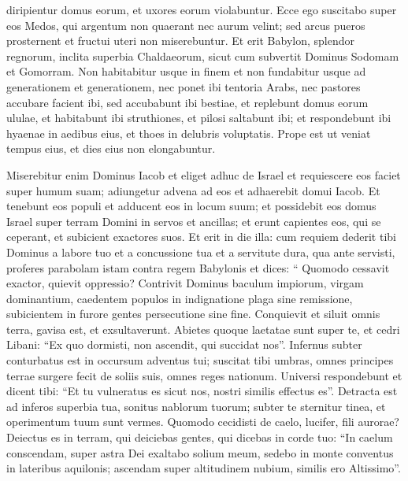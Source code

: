 \begin{biblechapter}
\begin{biblechapter}
\begin{biblechapter}
\begin{biblechapter}
\begin{biblechapter}
\begin{biblechapter}
\begin{biblechapter}
\begin{biblechapter}
\begin{biblechapter}
\begin{biblechapter}
\begin{biblechapter}
\begin{biblechapter}
\begin{biblechapter}
 diripientur domus eorum,
 et uxores eorum violabuntur.
 \verse Ecce ego suscitabo super eos Medos,
 qui argentum non quaerant nec aurum velint;
 \verse sed arcus pueros prosternent
 et fructui uteri non miserebuntur.
 \verse Et erit Babylon, splendor regnorum,
 inclita superbia Chaldaeorum,
 sicut cum subvertit Dominus Sodomam et Gomorram.
 \verse Non habitabitur usque in finem
 et non fundabitur usque ad generationem et generationem,
 nec ponet ibi tentoria Arabs,
 nec pastores accubare facient ibi,
 \verse sed accubabunt ibi bestiae,
 et replebunt domus eorum ululae,
 et habitabunt ibi struthiones,
 et pilosi saltabunt ibi;
 \verse et respondebunt ibi hyaenae in aedibus eius,
 et thoes in delubris voluptatis.
 Prope est ut veniat tempus eius,
 et dies eius non elongabuntur.
 
\begin{biblechapter}
\verse Miserebitur enim Dominus Iacob
 et eliget adhuc de Israel
 et requiescere eos faciet super humum suam;
 adiungetur advena ad eos
 et adhaerebit domui Iacob.
 \verse Et tenebunt eos populi
 et adducent eos in locum suum;
 et possidebit eos domus Israel
 super terram Domini in servos et ancillas;
 et erunt capientes eos, qui se ceperant,
 et subicient exactores suos.
 \verse Et erit in die illa:
 cum requiem dederit tibi Dominus
 a labore tuo et a concussione tua
 et a servitute dura, qua ante servisti,
 \verse proferes parabolam istam contra regem Babylonis et dices:
 “ Quomodo cessavit exactor, quievit oppressio?
 \verse Contrivit Dominus baculum impiorum,
 virgam dominantium,
 \verse caedentem populos in indignatione plaga sine remissione,
 subicientem in furore gentes persecutione sine fine.
 \verse Conquievit et siluit omnis terra,
 gavisa est, et exsultaverunt.
 \verse Abietes quoque laetatae sunt super te, et cedri Libani:
 “Ex quo dormisti, non ascendit, qui succidat nos”.
 \verse Infernus subter conturbatus est
 in occursum adventus tui;
 suscitat tibi umbras, omnes principes terrae
 surgere fecit de soliis suis,
 omnes reges nationum.
 \verse Universi respondebunt et dicent tibi:
 “Et tu vulneratus es sicut nos,
 nostri similis effectus es”.
 \verse Detracta est ad inferos superbia tua,
 sonitus nablorum tuorum;
 subter te sternitur tinea,
 et operimentum tuum sunt vermes.
 \verse Quomodo cecidisti de caelo, lucifer, fili aurorae?
 Deiectus es in terram, qui deiciebas gentes,
 \verse qui dicebas in corde tuo:
 “In caelum conscendam,
 super astra Dei exaltabo solium meum,
 sedebo in monte conventus
 in lateribus aquilonis;
 \verse ascendam super altitudinem nubium,
 similis ero Altissimo”.

\end{biblechapter}
\end{biblechapter}
\end{biblechapter}
\end{biblechapter}
\end{biblechapter}
\end{biblechapter}
\end{biblechapter}
\end{biblechapter}
\end{biblechapter}
\end{biblechapter}
\end{biblechapter}
\end{biblechapter}
\end{biblechapter}
\end{biblechapter}
